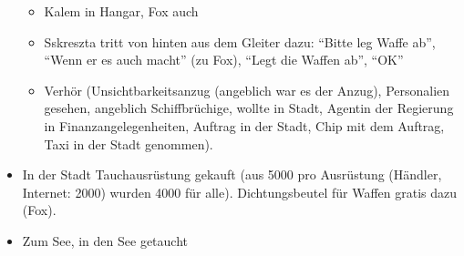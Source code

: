 \documentclass[11pt]{scrartcl}
\begin{document}
\begin{itemize}
  \begin{itemize}
  \item
    Kalem in Hangar, Fox auch
  \item
    Sskreszta tritt von hinten aus dem Gleiter dazu: ``Bitte leg Waffe
    ab'', ``Wenn er es auch macht'' (zu Fox), ``Legt die Waffen ab'',
    ``OK''
  \item
    Verhör (Unsichtbarkeitsanzug (angeblich war es der Anzug),
    Personalien gesehen, angeblich Schiffbrüchige, wollte in Stadt,
    Agentin der Regierung in Finanzangelegenheiten, Auftrag in der
    Stadt, Chip mit dem Auftrag, Taxi in der Stadt genommen).
  \end{itemize}
\item
  In der Stadt Tauchausrüstung gekauft (aus 5000 pro Ausrüstung
  (Händler, Internet: 2000) wurden 4000 für alle). Dichtungsbeutel für
  Waffen gratis dazu (Fox).
\item
  Zum See, in den See getaucht


\end{itemize}
\end{document}
